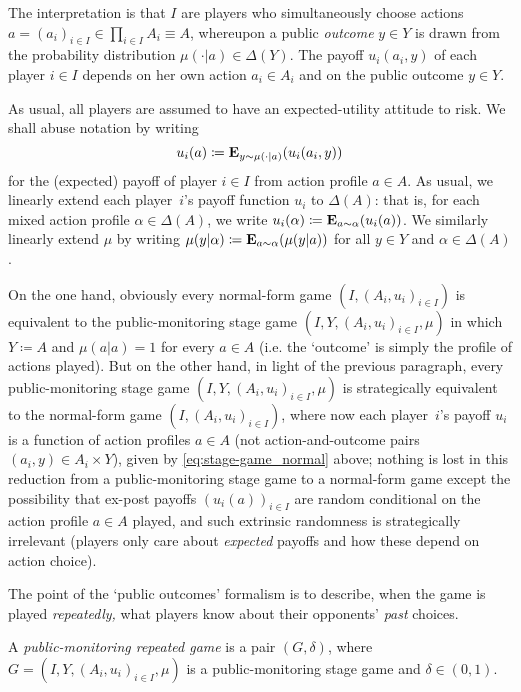 The interpretation is that $I$ are players who simultaneously choose actions $a = (a_i)_{i \in I} \in \prod_{i \in I} A_i \equiv A$, whereupon a public \emph{outcome} $y \in Y$ is drawn from the probability distribution $\mu(\cdot|a) \in \Delta(Y)$. The payoff $u_i(a_i,y)$ of each player $i \in I$ depends on her own action $a_i \in A_i$ and on the public outcome $y \in Y$.

As usual, all players are assumed to have an expected-utility attitude to risk. We shall abuse notation by writing
%
\begin{equation}
	u_i(a)
	\coloneqq \mathbf{E}_{y \sim \mu(\cdot|a)}( u_i(a_i,y) )
	\label{eq:stage-game_normal}
\end{equation}
%
for the (expected) payoff of player $i \in I$ from action profile $a \in A$. As usual, we linearly extend each player~$i$'s payoff function $u_i$ to $\Delta(A)$: that is, for each mixed action profile $\alpha \in \Delta(A)$, we write $u_i(\alpha) \coloneqq \E_{a \sim \alpha}\left( u_i(a) \right)$. We similarly linearly extend $\mu$ by writing $\mu(y|\alpha) \coloneqq \E_{a \sim \alpha}\left( \mu(y|a) \right)$ for all $y \in Y$ and $\alpha \in \Delta(A)$.

On the one hand, obviously every normal-form game $\left( I, (A_i, u_i)_{i \in I} \right)$ is equivalent to the public-monitoring stage game $\left( I, Y, (A_i, u_i)_{i \in I}, \mu \right)$ in which $Y \coloneqq A$ and $\mu(a|a) = 1$ for every $a \in A$ (i.e. the `outcome' is simply the profile of actions played). But on the other hand, in light of the previous paragraph, every public-monitoring stage game $\left( I, Y, (A_i, u_i)_{i \in I}, \mu \right)$ is strategically equivalent to the normal-form game $\left( I, (A_i, u_i)_{i \in I} \right)$, where now each player~$i$'s payoff $u_i$ is a function of action profiles $a \in A$ (not action-and-outcome pairs $(a_i,y) \in A_i \times Y$), given by \cref{eq:stage-game_normal} above; nothing is lost in this reduction from a public-monitoring stage game to a normal-form game except the possibility that ex-post payoffs $(u_i(a))_{i \in I}$ are random conditional on the action profile $a \in A$ played, and such extrinsic randomness is strategically irrelevant (players only care about \emph{expected} payoffs and how these depend on action choice).

The point of the `public outcomes' formalism is to describe, when the game is played \emph{repeatedly,} what players know about their opponents' \emph{past} choices.

\begin{definition}
	\label{definition:rep_game}
	A \emph{public-monitoring repeated game} is a pair $(G,\delta)$, where $G = \left( I, Y, (A_i, u_i)_{i \in I}, \mu \right)$ is a public-monitoring stage game and $\delta \in (0,1)$.
\end{definition}


